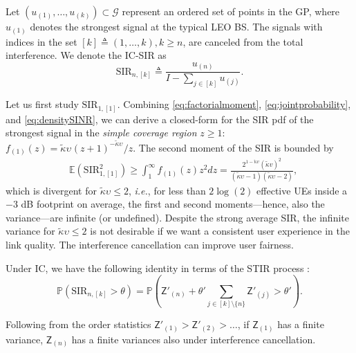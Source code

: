 \documentclass[lettersize,journal]{IEEEtran}
\begin{document}
Let $(u_{(1)}, \dots, u_{(k)}) \subset \mathcal{G}$ represent an ordered set of points in the GP, where $u_{(1)}$ denotes the strongest signal at the typical LEO BS. The signals with indices in the set $[k] \triangleq (1,\dots,k), k\geq n$,  are canceled from the total interference. We denote the IC-SIR as
\begin{equation}
  \label{eq:IC-SINR}
  \text{SIR}_{n,[k]} \triangleq \frac{u_{(n)}}{I-\sum_{j \in [k]} u_{(j)}}.
\end{equation}


Let us first study $\text{SIR}_{1,[1]}$. Combining \eqref{eq:factorialmoment}, \eqref{eq:jointprobability}, and \eqref{eq:densitySINR}, we can derive a closed-form for the SIR pdf of the strongest signal in the \textit{simple coverage region} $z\geq 1$: $f_{(1)}(z) =  {\tilde{\kappa}\upsilon_{}\left({z + 1} \right)^{-\tilde{\kappa}\upsilon_{}}}/{z}$. The second moment of the SIR is bounded by
\begin{align}
  \label{eq:SIR2}
&\mathbb{E}(\text{SIR}^2_{1,[1]}) \geq \int_{1}^{\infty}f_{(1)}(z) z^2 dz = \frac{2^{1-\tilde{\kappa}v}(\tilde{\kappa}v)^2}{(\tilde{\kappa}\upsilon-1)(\tilde{\kappa}\upsilon-2)},
\end{align}
which is divergent for $\tilde{\kappa}\upsilon \leq 2$, \textit{i.e.}, for less than $2\log(2)$ effective UEs inside a $-3$ dB footprint on average, the first and second moments---hence, also the variance---are infinite (or undefined). Despite the strong average SIR, the infinite variance for $\tilde{\kappa}\upsilon \leq 2$ is not desirable if we want a consistent user experience in the link quality. The interference cancellation can improve user fairness.


Under IC, we have the following identity in terms of the STIR process \cite[Eq. 69]{7305791}:
\begin{equation}
   \mathbb{P}(\text{SIR}_{n,[k]} > \theta) = \mathbb{P}\left(\mathsf{Z}'_{(n)}+\theta'\sum_{j\in [k] \setminus \{n\}}\mathsf{Z}'_{(j)} > \theta'\right).
\end{equation}


Following from the order statistics $\mathsf{Z}'_{(1)} > \mathsf{Z}'_{(2)} >\dots $, if $\mathsf{Z}_{(1)}$ has a finite variance, $\mathsf{Z}_{(n)}$ has a finite variances also under interference cancellation.
\end{document}

